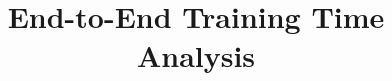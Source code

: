 \documentclass[11pt,a4paper]{article}
\title{End-to-End Training Time Analysis}
\author{}
\date{}
\begin{document}
\maketitle

\label{tab:comm-comparison}


\end{document}
